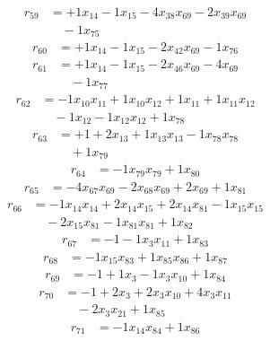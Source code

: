 \[\begin{aligned}
r_{59} &= + 1 x_{14} - 1 x_{15} - 4 x_{38} x_{69} - 2 x_{39} x_{69} \\
 &\quad - 1 x_{75}
\end{aligned}\]
\[\begin{aligned}
r_{60} &= + 1 x_{14} - 1 x_{15} - 2 x_{42} x_{69} - 1 x_{76}
\end{aligned}\]
\[\begin{aligned}
r_{61} &= + 1 x_{14} - 1 x_{15} - 2 x_{46} x_{69} - 4 x_{69} \\
 &\quad - 1 x_{77}
\end{aligned}\]
\[\begin{aligned}
r_{62} &= - 1 x_{10} x_{11} + 1 x_{10} x_{12} + 1 x_{11} + 1 x_{11} x_{12} \\
 &\quad - 1 x_{12} - 1 x_{12} x_{12} + 1 x_{78}
\end{aligned}\]
\[\begin{aligned}
r_{63} &= + 1 + 2 x_{13} + 1 x_{13} x_{13} - 1 x_{78} x_{78} \\
 &\quad + 1 x_{79}
\end{aligned}\]
\[\begin{aligned}
r_{64} &= - 1 x_{79} x_{79} + 1 x_{80}
\end{aligned}\]
\[\begin{aligned}
r_{65} &= - 4 x_{67} x_{69} - 2 x_{68} x_{69} + 2 x_{69} + 1 x_{81}
\end{aligned}\]
\[\begin{aligned}
r_{66} &= - 1 x_{14} x_{14} + 2 x_{14} x_{15} + 2 x_{14} x_{81} - 1 x_{15} x_{15} \\
 &\quad - 2 x_{15} x_{81} - 1 x_{81} x_{81} + 1 x_{82}
\end{aligned}\]
\[\begin{aligned}
r_{67} &= - 1 - 1 x_{3} x_{11} + 1 x_{83}
\end{aligned}\]
\[\begin{aligned}
r_{68} &= - 1 x_{15} x_{83} + 1 x_{85} x_{86} + 1 x_{87}
\end{aligned}\]
\[\begin{aligned}
r_{69} &= - 1 + 1 x_{3} - 1 x_{3} x_{10} + 1 x_{84}
\end{aligned}\]
\[\begin{aligned}
r_{70} &= - 1 + 2 x_{3} + 2 x_{3} x_{10} + 4 x_{3} x_{11} \\
 &\quad - 2 x_{3} x_{21} + 1 x_{85}
\end{aligned}\]
\[\begin{aligned}
r_{71} &= - 1 x_{14} x_{84} + 1 x_{86}
\end{aligned}\]

